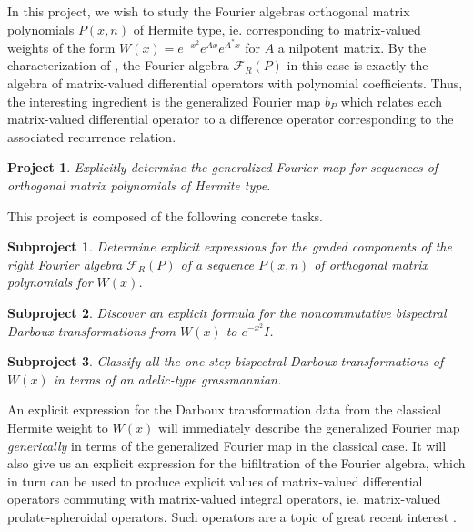 \documentclass[11pt,letterpaper]{article}
\newtheorem{goal}{Project}
\newtheorem{subgoal}{Subproject}[goal]
\theoremstyle{definition}
\begin{document}
In this project, we wish to study the Fourier algebras orthogonal matrix polynomials $P(x,n)$ of Hermite type, ie. corresponding to matrix-valued weights of the form $W(x) = e^{-x^2}e^{Ax}e^{A^*x}$ for $A$ a nilpotent matrix.
By the characterization of \cite{CY2018}, the Fourier algebra $\mathcal F_R(P)$ in this case is exactly the algebra of matrix-valued differential operators with polynomial coefficients.
Thus, the interesting ingredient is the generalized Fourier map $b_P$ which relates each matrix-valued differential operator to a difference operator corresponding to the associated recurrence relation.  
\begin{goal}
Explicitly determine the generalized Fourier map for sequences of orthogonal matrix polynomials of Hermite type.
\end{goal}
\noindent This project is composed of the following concrete tasks.
\begin{subgoal}
Determine explicit expressions for the graded components of the right Fourier algebra $\mathcal F_R(P)$ of a sequence $P(x,n)$ of orthogonal matrix polynomials for $W(x)$.
\end{subgoal}
\begin{subgoal}
Discover an explicit formula for the noncommutative bispectral Darboux transformations from $W(x)$ to $e^{-x^2}I$.
\end{subgoal}
\begin{subgoal}
Classify all the one-step bispectral Darboux transformations of $W(x)$ in terms of an adelic-type grassmannian.
\end{subgoal}
An explicit expression for the Darboux transformation data from the classical Hermite weight to $W(x)$ will immediately describe the generalized Fourier map \emph{generically} in terms of the generalized Fourier map in the classical case.
It will also give us an explicit expression for the bifiltration of the Fourier algebra, which in turn can be used to produce explicit values of matrix-valued differential operators commuting with matrix-valued integral operators, ie. matrix-valued prolate-spheroidal operators.
Such operators are a topic of great recent interest \cite{grunbaum2017,grunbaum2015}.
\end{document}

